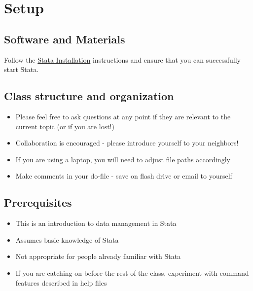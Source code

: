 \documentclass[
]{book}
\providecommand{\tightlist}{%
  \setlength{\itemsep}{0pt}\setlength{\parskip}{0pt}}
\begin{document}
\hypertarget{setup-7}{%
\section{Setup}\label{setup-7}}

\hypertarget{software-and-materials-7}{%
\subsection{Software and Materials}\label{software-and-materials-7}}

Follow the \href{./StataInstall.html}{Stata Installation} instructions and ensure that you can successfully start Stata.

\hypertarget{class-structure-and-organization-1}{%
\subsection{Class structure and organization}\label{class-structure-and-organization-1}}

\begin{itemize}
\tightlist
\item
  Please feel free to ask questions at any point if they are relevant to the current topic (or if you are lost!)
\item
  Collaboration is encouraged - please introduce yourself to your neighbors!
\item
  If you are using a laptop, you will need to adjust file paths accordingly
\item
  Make comments in your do-file - save on flash drive or email to yourself
\end{itemize}

\hypertarget{prerequisites-7}{%
\subsection{Prerequisites}\label{prerequisites-7}}

\begin{itemize}
\tightlist
\item
  This is an introduction to data management in Stata
\item
  Assumes basic knowledge of Stata
\item
  Not appropriate for people already familiar with Stata
\item
  If you are catching on before the rest of the class, experiment with command features described in help files
\end{itemize}
\end{document}
